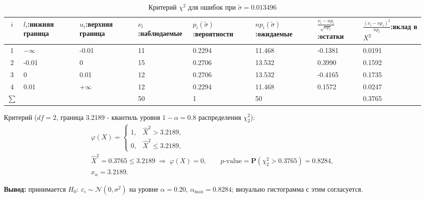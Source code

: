 \documentclass[12pt]{spbstu-task}
\renewcommand{\Prob}{\mathbf{P}}
\begin{document}
\begin{table}[H]
  \caption{Критерий \(\chi^2\) для ошибок при \(\tilde{\sigma} = 0.013496\)}
  \centering
  \small
  \setlength{\tabcolsep}{2pt}
  \begin{tabularx}{\textwidth}{c*{7}{Y}}
    \toprule
    \(i\) & \(l_i\):\newline нижняя граница & \(u_i\):\newline верхняя граница & \(\nu_i\):\newline наблюдаемые
    & \(p_i(\tilde{\sigma})\):\newline вероятности & \(np_i(\tilde{\sigma})\):\newline ожидаемые
    & \(\frac{\nu_i - np_i}{\sqrt{np_i}}\):\newline остатки & \(\frac{(\nu_i - np_i)^2}{np_i}\):\newline вклад в \(X^2\) \\
     & \(-\infty\) & -0.01 & 11 & 0.2294 & 11.468 & -0.1381 & 0.0191 \\
    2 & -0.01 & 0 & 15 & 0.2706 & 13.532 & 0.3990 & 0.1592 \\
    3 & 0 & 0.01 & 12 & 0.2706 & 13.532 & -0.4165 & 0.1735 \\
    4 & 0.01 & \(+\infty\) & 12 & 0.2294 & 11.468 & 0.1572 & 0.0247 \\
    \midrule
    \(\sum\) & & & 50 & 1 & 50 & & 0.3765 \\
    \bottomrule
  \end{tabularx}
\end{table}

Критерий (\(df = 2\), граница 3.2189 - квантиль уровня \(1 - \alpha = 0.8\) распределения \(\chi^2_2\)):
\begin{gather*}
  \varphi(X) =
  \begin{cases}
    1, & \hat{X}^2 > 3.2189,\\
    0, & \hat{X}^2 \le 3.2189,
  \end{cases}\\
  \hat{X}^2 = 0.3765 \le 3.2189 \;\Rightarrow\; \varphi(X) = 0,\qquad
  p\text{-value} = \Prob\left(\chi^2_2 > 0.3765\right) = 0.8284,\\
  x_\alpha = 3.2189.
\end{gather*}

\noindent\textbf{Вывод:} принимается \(H_0:\ \varepsilon_i \sim \mathcal{N}(0, \sigma^2)\) на уровне \(\alpha = 0.20\),
\(\alpha_{\max} = 0.8284\); визуально гистограмма с этим согласуется.

\end{document}
